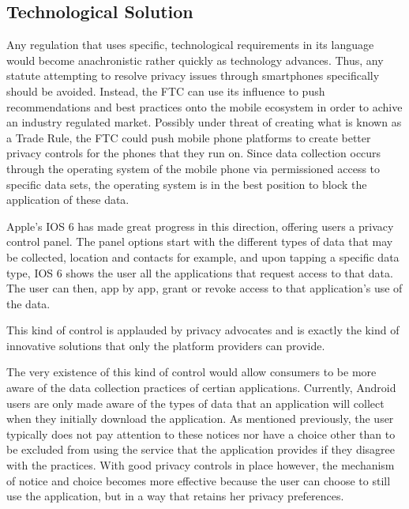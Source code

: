  	\subsection{Technological Solution}
Any regulation that uses specific, technological requirements in its language would become anachronistic rather quickly as technology advances. Thus, any statute attempting to resolve privacy issues through smartphones specifically should be avoided. Instead, the FTC can use its influence to push recommendations and best practices onto the mobile ecosystem in order to achive an industry regulated market. 
Possibly under threat of creating what is known as a Trade Rule, the FTC could push mobile phone platforms to create better privacy controls for the phones that they run on. 
Since data collection occurs through the operating system of the mobile phone via permissioned access to specific data sets, the operating system is in the best position to block the application of these data. 

Apple's IOS 6 has made great progress in this direction, offering users a privacy control panel. The panel options start with the different types of data that may be collected, location and contacts for example, and upon tapping a specific data type, IOS 6 shows the user all the applications that request access to that data. The user can then, app by app, grant or revoke access to that application's use of the data.

This kind of control is applauded by privacy advocates and is exactly the kind of innovative solutions that only the platform providers can provide. 

The very existence of this kind of control would allow consumers to be more aware of the data collection practices of certian applications. Currently, Android users are only made aware of the types of data that an application will collect when they initially download the application. As mentioned previously, the user typically does not pay attention to these notices nor have a choice other than to be excluded from using the service that the application provides if they disagree with the practices.
With good privacy controls in place however, the mechanism of notice and choice becomes more effective because the user can choose to still use the application, but in a way that retains her privacy preferences.

